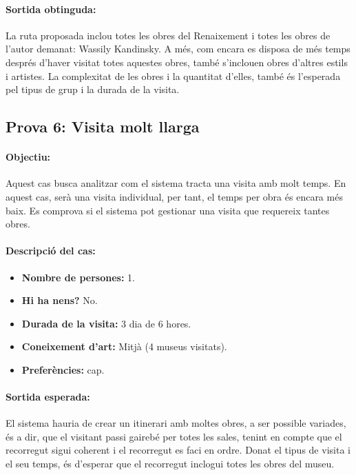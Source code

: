 \documentclass[a4paper]{article}
\begin{document}
	\paragraph{Sortida obtinguda:}
	La ruta proposada inclou totes les obres del Renaixement i totes les obres de l'autor demanat: Wassily Kandinsky. A més, com encara es disposa de més temps després d'haver visitat totes aquestes obres, també s'inclouen obres d'altres estils i artistes. La complexitat de les obres i la quantitat d'elles, també és l'esperada pel tipus de grup i la durada de la visita.
	
	\subsection{Prova 6: Visita molt llarga}
	
	\paragraph{Objectiu:} 
	Aquest cas busca analitzar com el sistema tracta una visita amb molt temps. En aquest cas, serà una visita individual, per tant, el temps per obra és encara més baix. Es comprova si el sistema pot gestionar una visita que requereix tantes obres.
	
	\paragraph{Descripció del cas:} 
	
	\begin{itemize}
		\item \textbf{Nombre de persones:} 1.
		\item \textbf{Hi ha nens?} No.
		\item \textbf{Durada de la visita:} 3 dia de 6 hores.
		\item \textbf{Coneixement d’art:} Mitjà (4 museus visitats).
		\item \textbf{Preferències:} cap.
	\end{itemize}
	
	\paragraph{Sortida esperada:}
	El sistema hauria de crear un itinerari amb moltes obres, a ser possible variades, és a dir, que el visitant passi gairebé per totes les sales, tenint en compte que el recorregut sigui coherent i el recorregut es faci en ordre. Donat el tipus de visita i el seu temps, és d'esperar que el recorregut inclogui totes les obres del museu.
	
\end{document}
